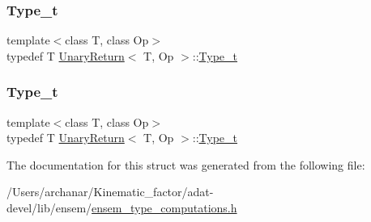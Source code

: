 \subsubsection{\texorpdfstring{Type\_t}{Type\_t}\hspace{0.1cm}{\footnotesize\ttfamily [2/3]}}
{\footnotesize\ttfamily template$<$class T, class Op$>$ \\
typedef T \mbox{\hyperlink{structUnaryReturn}{Unary\+Return}}$<$ T, Op $>$\+::\mbox{\hyperlink{structUnaryReturn_afbc19933d7ee2962cbb363213d46dee0}{Type\+\_\+t}}}

\mbox{\label{structUnaryReturn_afbc19933d7ee2962cbb363213d46dee0}} 
\subsubsection{\texorpdfstring{Type\_t}{Type\_t}\hspace{0.1cm}{\footnotesize\ttfamily [3/3]}}
{\footnotesize\ttfamily template$<$class T, class Op$>$ \\
typedef T \mbox{\hyperlink{structUnaryReturn}{Unary\+Return}}$<$ T, Op $>$\+::\mbox{\hyperlink{structUnaryReturn_afbc19933d7ee2962cbb363213d46dee0}{Type\+\_\+t}}}



The documentation for this struct was generated from the following file\+:\begin{DoxyCompactItemize}
\item 
/\+Users/archanar/\+Kinematic\+\_\+factor/adat-\/devel/lib/ensem/\mbox{\hyperlink{adat-devel_2lib_2ensem_2ensem__type__computations_8h}{ensem\+\_\+type\+\_\+computations.\+h}}\end{DoxyCompactItemize}
